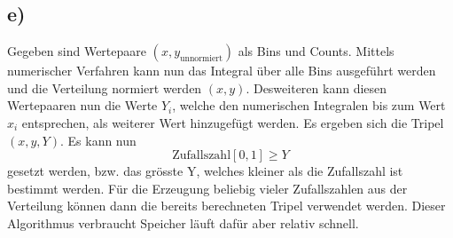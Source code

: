\subsection{e)}
Gegeben sind Wertepaare $(x,y_{\text{unnormiert}})$ als Bins und Counts. Mittels numerischer Verfahren kann nun das Integral über alle Bins ausgeführt werden und die Verteilung normiert werden $(x,y)$. Desweiteren kann diesen Wertepaaren nun die Werte $Y_i$, welche den numerischen Integralen bis zum Wert $x_i$ entsprechen, als weiterer Wert hinzugefügt werden. Es ergeben sich die Tripel $(x,y,Y)$. Es kann nun
\begin{equation}
  \text{Zufallszahl}[0,1]\geq Y
\end{equation}
gesetzt werden, bzw. das grösste Y, welches kleiner als die Zufallszahl ist bestimmt werden. Für die Erzeugung beliebig vieler Zufallszahlen aus der Verteilung können dann die bereits berechneten Tripel verwendet werden. Dieser Algorithmus verbraucht Speicher läuft dafür aber relativ schnell.%
